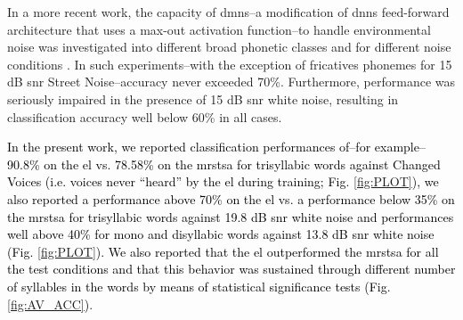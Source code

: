 \documentclass[10pt,letterpaper]{article}
\newcommand{\reviewerfour}[1]{\textcolor{black}{#1}}
\begin{document}
In a more recent work, the capacity of \glspl{dmn}--a modification of \glspl{dnn} feed-forward architecture that uses a max-out activation function--to handle environmental noise was investigated into different broad phonetic classes and for different noise conditions \cite{silos_2016}.  In such experiments--with the exception of fricatives phonemes for 15 dB \gls{snr} Street Noise--accuracy never exceeded 70\%. Furthermore, performance was seriously impaired in the presence of 15 dB \gls{snr} white noise, resulting in classification accuracy  well below 60\% in all cases.

\reviewerfour{In the present work, we reported classification performances of--for example--90.8\% on the \gls{el} vs. 78.58\% on the \gls{mrstsa} for trisyllabic words against Changed Voices (i.e. voices never ``heard'' by the \gls{el} during training; Fig. \ref{fig:PLOT}), we also reported a performance above 70\% on the \gls{el} vs. a performance below 35\% on the \gls{mrstsa} for trisyllabic words against 19.8 dB \gls{snr} white noise and performances well above 40\% for mono and disyllabic words against 13.8 dB \gls{snr} white noise (Fig. \ref{fig:PLOT}). We also reported that the \gls{el} outperformed the \gls{mrstsa} for all the test conditions and that this behavior was sustained through different number of syllables in the words by means of statistical significance tests (Fig. \ref{fig:AV_ACC})}.
\end{document}
